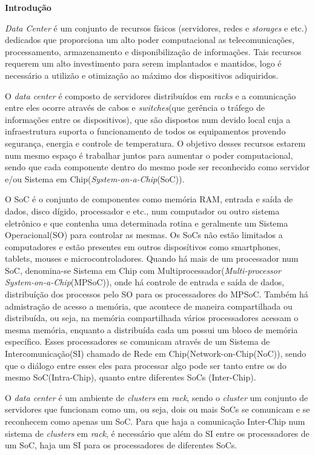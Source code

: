 \documentclass[a4paper,12pt]{article}
\begin{document}
\begin{center}
\textbf{{\LARGE Introdução}} \\ \vspace{0.5cm}
\end{center}

\textit{Data Center} é um conjunto de recursos físicos (servidores, redes e \textit{storages} e etc.) dedicados que proporciona um alto poder computacional as telecomunicações, processamento, armazenamento e disponibilização de informações. Tais recursos requerem um alto investimento para serem implantados e mantidos, logo é necessário a utilizão e otimização ao máximo dos dispositivos adiquiridos.

O \textit{data center} é composto de servidores distribuídos em \textit{racks} e a comunicação entre eles ocorre através de cabos e \textit{switches}(que gerência o tráfego de informações entre os dispositivos), que são dispostos num devido local cuja a infraestrutura suporta o funcionamento de todos os equipamentos provendo segurança, energia e controle de temperatura. O objetivo desses recursos estarem num mesmo espaço é trabalhar juntos para aumentar o poder computacional, sendo que cada componente dentro do mesmo pode ser reconhecido como servidor e/ou Sistema em Chip(\textit{System-on-a-Chip}(SoC)).

O SoC é o conjunto de componentes como memória RAM, entrada e saída de dados, disco dígido, processador e etc., num computador ou outro sistema eletrônico e que contenha uma determinada rotina e geralmente um Sistema Operacional(SO) para controlar as mesmas. Os SoCs não estão limitados a computadores e estão presentes em outros disposítivos como smartphones, tablets, mouses e microcontroladores. Quando há mais de um processador num SoC, denomina-se Sistema em Chip com Multiprocessador(\textit{Multi-processor System-on-a-Chip}(MPSoC)), onde há controle de entrada e saída de dados, distribuíção dos processos pelo SO para os processadores do MPSoC. Também há admistração de acesso a memória, que acontece de maneira compartilhada ou distribuída, ou seja, na memória compartilhada vários processadores acessam o mesma memória, enquanto a distribuída cada um possui um bloco de memória específico. Esses processadores se comunicam através de um Sistema de Intercomunicação(SI) chamado de Rede em Chip(Network-on-Chip(NoC)), sendo que o diálogo entre esses eles para processar algo pode ser tanto entre os do mesmo SoC(Intra-Chip), quanto entre diferentes SoCs (Inter-Chip).

O \textit{data center} é um ambiente de \textit{clusters} em \textit{rack}, sendo o \textit{cluster} um conjunto de servidores que funcionam como um, ou seja, dois ou mais SoCs se comunicam e se reconhecem como apenas um SoC. Para que haja a comunicação Inter-Chip num sistema de \textit{clusters} em \textit{rack}, é necessário que além do SI entre os processadores de um SoC, haja um SI para os processadores de diferentes SoCs.

\end{document}
